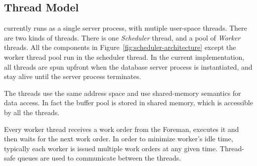 \subsection{Thread Model}\label{ssec:thread}
\sys{} currently runs as a single server process, with mutiple user-space threads. 
There are two kinds of threads. 
There is one \textit{Scheduler} thread, and a pool of \textit{Worker} threads. 
All the components in 
Figure~\ref{fig:scheduler-architecture} except the worker thread pool run in the 
scheduler thread. 
In the current implementation, all threads are spun upfront when the database server 
process is instantiated, and stay alive until the server process terminates.

The threads use the same address space and use shared-memory semantics for data 
access. 
In fact the buffer pool is stored in shared memory, which is accessible by all the threads. 

Every worker thread receives a work order from the Foreman, executes it and then waits for 
the next work order.
In order to minimize worker's idle time, typically each worker is issued multiple work 
orders at any given time. 
Thread-safe queues are used to communicate between the threads.


